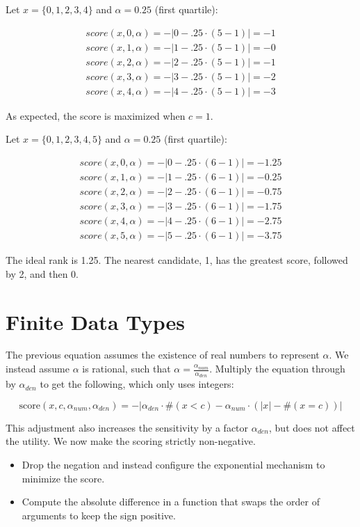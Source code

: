 \documentclass{article}
\begin{document}
Let $x = \{0,1,2,3,4\}$ and $\alpha = 0.25$ (first quartile):

\begin{align*}
    score(x, 0, \alpha) = -|0 - .25 \cdot (5 - 1)| = -1 \\
    score(x, 1, \alpha) = -|1 - .25 \cdot (5 - 1)| = -0 \\
    score(x, 2, \alpha) = -|2 - .25 \cdot (5 - 1)| = -1 \\
    score(x, 3, \alpha) = -|3 - .25 \cdot (5 - 1)| = -2 \\
    score(x, 4, \alpha) = -|4 - .25 \cdot (5 - 1)| = -3
\end{align*}

As expected, the score is maximized when $c = 1$.

Let $x = \{0,1,2,3,4,5\}$ and $\alpha = 0.25$ (first quartile):

\begin{align*}
    score(x, 0, \alpha) = -|0 - .25 \cdot (6 - 1)| = -1.25 \\
    score(x, 1, \alpha) = -|1 - .25 \cdot (6 - 1)| = -0.25 \\
    score(x, 2, \alpha) = -|2 - .25 \cdot (6 - 1)| = -0.75 \\
    score(x, 3, \alpha) = -|3 - .25 \cdot (6 - 1)| = -1.75 \\
    score(x, 4, \alpha) = -|4 - .25 \cdot (6 - 1)| = -2.75 \\
    score(x, 5, \alpha) = -|5 - .25 \cdot (6 - 1)| = -3.75
\end{align*}

The ideal rank is 1.25. The nearest candidate, 1, has the greatest score, followed by 2, and then 0. 


\section{Finite Data Types}
The previous equation assumes the existence of real numbers to represent $\alpha$.
We instead assume $\alpha$ is rational, such that $\alpha = \frac{\alpha_{num}}{\alpha_{den}}$.
Multiply the equation through by $\alpha_{den}$ to get the following, 
which only uses integers:

\begin{equation}
    \textrm{score}(x, c, \alpha_{num}, \alpha_{den}) = -|\alpha_{den} \cdot \#(x < c) - \alpha_{num} \cdot (|x| - \#(x = c))|
\end{equation}

This adjustment also increases the sensitivity by a factor $\alpha_{den}$, 
but does not affect the utility.
We now make the scoring strictly non-negative.
\begin{itemize}
    \item Drop the negation and instead configure the exponential mechanism to minimize the score.
    \item Compute the absolute difference in a function that swaps the order of arguments to keep the sign positive.
\end{itemize}
\end{document}
